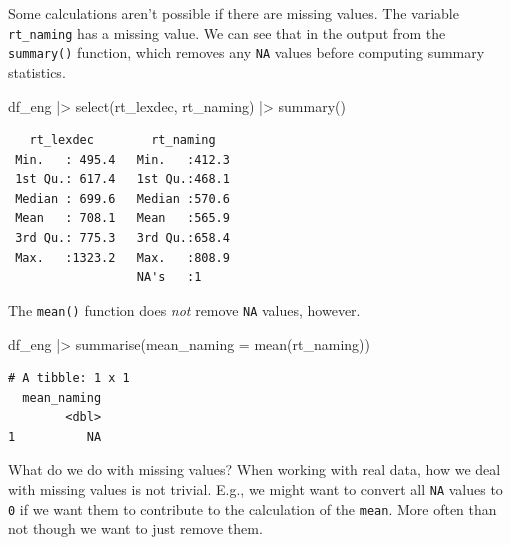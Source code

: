 \documentclass[
  letterpaper,
  DIV=11,
  numbers=noendperiod]{scrartcl}
\newenvironment{Shaded}{\begin{snugshade}}{\end{snugshade}}
\newcommand{\AttributeTok}[1]{\textcolor[rgb]{0.40,0.45,0.13}{#1}}
\newcommand{\FunctionTok}[1]{\textcolor[rgb]{0.28,0.35,0.67}{#1}}
\newcommand{\NormalTok}[1]{\textcolor[rgb]{0.00,0.23,0.31}{#1}}
\newcommand{\SpecialCharTok}[1]{\textcolor[rgb]{0.37,0.37,0.37}{#1}}
\begin{document}
\begin{tcolorbox}[enhanced jigsaw, colframe=quarto-callout-tip-color-frame, rightrule=.15mm, breakable, coltitle=black, opacityback=0, leftrule=.75mm, colback=white, toprule=.15mm, opacitybacktitle=0.6, colbacktitle=quarto-callout-tip-color!10!white, bottomrule=.15mm, toptitle=1mm, left=2mm, titlerule=0mm, arc=.35mm, title=\textcolor{quarto-callout-tip-color}{\faLightbulb}\hspace{0.5em}{Missing values}, bottomtitle=1mm]

Some calculations aren't possible if there are missing values. The
variable \texttt{rt\_naming} has a missing value. We can see that in the
output from the \texttt{summary()} function, which removes any
\texttt{NA} values before computing summary statistics.

\begin{Shaded}
\begin{Highlighting}[]
\NormalTok{df\_eng }\SpecialCharTok{|\textgreater{}}
  \FunctionTok{select}\NormalTok{(rt\_lexdec, rt\_naming) }\SpecialCharTok{|\textgreater{}}
  \FunctionTok{summary}\NormalTok{()}
\end{Highlighting}
\end{Shaded}

\begin{verbatim}
   rt_lexdec        rt_naming    
 Min.   : 495.4   Min.   :412.3  
 1st Qu.: 617.4   1st Qu.:468.1  
 Median : 699.6   Median :570.6  
 Mean   : 708.1   Mean   :565.9  
 3rd Qu.: 775.3   3rd Qu.:658.4  
 Max.   :1323.2   Max.   :808.9  
                  NA's   :1      
\end{verbatim}

The \texttt{mean()} function does \emph{not} remove \texttt{NA} values,
however.

\begin{Shaded}
\begin{Highlighting}[]
\NormalTok{df\_eng }\SpecialCharTok{|\textgreater{}}
  \FunctionTok{summarise}\NormalTok{(}\AttributeTok{mean\_naming =} \FunctionTok{mean}\NormalTok{(rt\_naming))}
\end{Highlighting}
\end{Shaded}

\begin{verbatim}
# A tibble: 1 x 1
  mean_naming
        <dbl>
1          NA
\end{verbatim}

What do we do with missing values? When working with real data, how we
deal with missing values is not trivial. E.g., we might want to convert
all \texttt{NA} values to \texttt{0} if we want them to contribute to
the calculation of the \texttt{mean}. More often than not though we want
to just remove them.


\end{tcolorbox}
\end{document}

